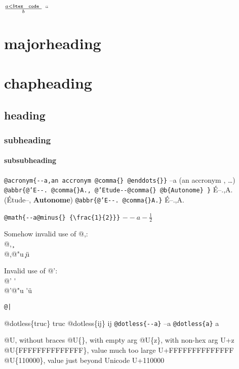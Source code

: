 \documentclass{book}
\newcommand{\Texinfoplaceholder}[1]{}
\newcommand{\Texinfonopagebreakheading}[2]{{\let\clearpage\relax \let\cleardoublepage\relax \let\thispagestyle\Texinfoplaceholder #1{#2}}}
\renewcommand{\_}{\Texinfounderscore\discretionary{}{}{}}
\begin{document}
$\frac{a < b \texttt{tex \hbox{ code }}}{b}$ ``

\Texinfonopagebreakheading{\chapter*}{{majorheading}}

\Texinfonopagebreakheading{\chapter*}{{chapheading}}

\section*{{heading}}

\subsection*{{subheading}}

\subsubsection*{{subsubheading}}


\texttt{@acronym\{{-}{-}a,an accronym @comma\{\}\ @enddots\{\}\}} --a (an accronym , \dots{})
\texttt{@abbr\{@'E{-}{-}.\ @comma\{\}A.,\ @'Etude{-}{-}@comma\{\}\ @b\{Autonome\}\ \}} \'{E}--.\@ ,A.\@ (\'{E}tude--, \textbf{Autonome})
\texttt{@abbr\{@'E{-}{-}.\ @comma\{\}A.\}} \'{E}--.\@ ,A.\@

\texttt{@math\{{-}{-}a@minus\{\}\ \{\textbackslash{}frac\{1\}\{2\}\}\}} $--a- {\frac{1}{2}}$




Somehow invalid use of @,:\leavevmode{}\\
@, \c{}\leavevmode{}\\
@,@"u \c{}\"{u}

Invalid use of @':\leavevmode{}\\
@' \'{}\leavevmode{}\\
@'@"u \'{}\"{u}

\texttt{@|} 

@dotless\{truc\} truc
@dotless\{ij\} ij
\texttt{@dotless\{{-}{-}a\}} --a
\texttt{@dotless\{a\}} a

@U, without braces @U\{\}, with empty arg 
@U\{z\}, with non-hex arg U+z
@U\{FFFFFFFFFFFFFF\}, value much too large U+FFFFFFFFFFFFFF
@U\{110000\}, value just beyond Unicode U+110000
\end{document}
